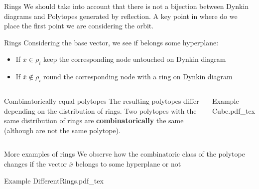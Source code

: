 \documentclass{beamer}
\newcommand{\incfig}[1]{%
\center
\def\svgwidth{0.9\columnwidth}
{#1.pdf_tex}
}
\begin{document}
\begin{frame}{Rings}
  We should take into account that there is not a bijection between Dynkin diagrams and Polytopes generated by reflection. A key point in where do we place the first point we are considering the orbit.
  \begin{block}{Rings}
   Considering the base vector, we see if belongs some hyperplane:
   \begin{itemize}[topsep=-6pt, itemsep=0pt]
     \item If $\overline{x}\in \rho _i$ keep the corresponding node untouched on Dynkin diagram
     \item If $\overline{x}\not\in \rho _i$ round the corresponding node with a ring on Dynkin diagram
   \end{itemize}
  \end{block}
  \begin{columns}[c]
  \begin{block}{Combinatorically equal polytopes}
  The resulting polytopes differ depending on the distribution of rings. Two polytopes with the same distribution of rings are \textbf{combinatorically} the same (although are not the same polytope).
  \end{block}
  \begin{block}{Example}
   \incfig{Cube} 
  \end{block}
  \end{columns}
\end{frame}

\begin{frame}{More examples of rings}
  We observe how the combinatoric class of the polytope changes if the vector $\overline{x}$ belongs to some hyperplane or not
  \begin{block}{Example}
   \incfig{DifferentRings} 
  \end{block}
\end{frame}
\end{document}
